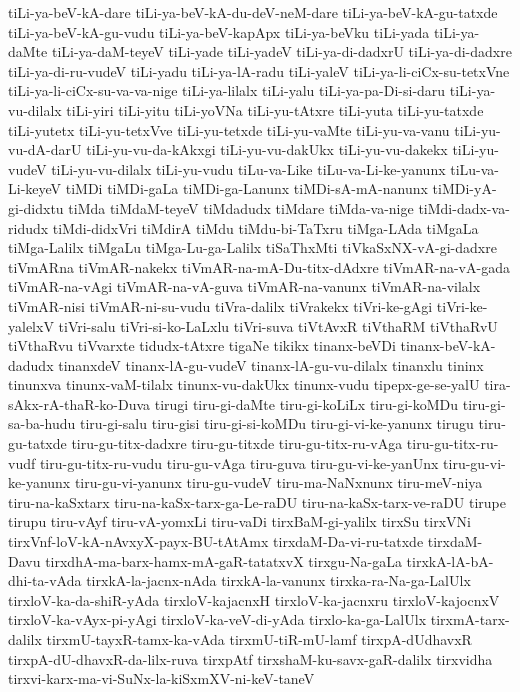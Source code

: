 {tiLi-ya-beV-kA-dare
tiLi-ya-beV-kA-du-deV-neM-dare
tiLi-ya-beV-kA-gu-tatxde
tiLi-ya-beV-kA-gu-vudu
tiLi-ya-beV-kapApx
tiLi-ya-beVku
tiLi-yada
tiLi-ya-daMte
tiLi-ya-daM-teyeV
tiLi-yade
tiLi-yadeV
tiLi-ya-di-dadxrU
tiLi-ya-di-dadxre
tiLi-ya-di-ru-vudeV
tiLi-yadu
tiLi-ya-lA-radu
tiLi-yaleV
tiLi-ya-li-ciCx-su-tetxVne
tiLi-ya-li-ciCx-su-va-va-nige
tiLi-ya-lilalx
tiLi-yalu
tiLi-ya-pa-Di-si-daru
tiLi-ya-vu-dilalx
tiLi-yiri
tiLi-yitu
tiLi-yoVNa
tiLi-yu-tAtxre
tiLi-yuta
tiLi-yu-tatxde
tiLi-yutetx
tiLi-yu-tetxVve
tiLi-yu-tetxde
tiLi-yu-vaMte
tiLi-yu-va-vanu
tiLi-yu-vu-dA-darU
tiLi-yu-vu-da-kAkxgi
tiLi-yu-vu-dakUkx
tiLi-yu-vu-dakekx
tiLi-yu-vudeV
tiLi-yu-vu-dilalx
tiLi-yu-vudu
tiLu-va-Like
tiLu-va-Li-ke-yanunx
tiLu-va-Li-keyeV
tiMDi
tiMDi-gaLa
tiMDi-ga-Lanunx
tiMDi-sA-mA-nanunx
tiMDi-yA-gi-didxtu
tiMda
tiMdaM-teyeV
tiMdadudx
tiMdare
tiMda-va-nige
tiMdi-dadx-va-ridudx
tiMdi-didxVri
tiMdirA
tiMdu
tiMdu-bi-TaTxru
tiMga-LAda
tiMgaLa
tiMga-Lalilx
tiMgaLu
tiMga-Lu-ga-Lalilx
tiSaThxMti
tiVkaSxNX-vA-gi-dadxre
tiVmARna
tiVmAR-nakekx
tiVmAR-na-mA-Du-titx-dAdxre
tiVmAR-na-vA-gada
tiVmAR-na-vAgi
tiVmAR-na-vA-guva
tiVmAR-na-vanunx
tiVmAR-na-vilalx
tiVmAR-nisi
tiVmAR-ni-su-vudu
tiVra-dalilx
tiVrakekx
tiVri-ke-gAgi
tiVri-ke-yalelxV
tiVri-salu
tiVri-si-ko-LaLxlu
tiVri-suva
tiVtAvxR
tiVthaRM
tiVthaRvU
tiVthaRvu
tiVvarxte
tidudx-tAtxre
tigaNe
tikikx
tinanx-beVDi
tinanx-beV-kA-dadudx
tinanxdeV
tinanx-lA-gu-vudeV
tinanx-lA-gu-vu-dilalx
tinanxlu
tininx
tinunxva
tinunx-vaM-tilalx
tinunx-vu-dakUkx
tinunx-vudu
tipepx-ge-se-yalU
tira-sAkx-rA-thaR-ko-Duva
tirugi
tiru-gi-daMte
tiru-gi-koLiLx
tiru-gi-koMDu
tiru-gi-sa-ba-hudu
tiru-gi-salu
tiru-gisi
tiru-gi-si-koMDu
tiru-gi-vi-ke-yanunx
tirugu
tiru-gu-tatxde
tiru-gu-titx-dadxre
tiru-gu-titxde
tiru-gu-titx-ru-vAga
tiru-gu-titx-ru-vudf
tiru-gu-titx-ru-vudu
tiru-gu-vAga
tiru-guva
tiru-gu-vi-ke-yanUnx
tiru-gu-vi-ke-yanunx
tiru-gu-vi-yanunx
tiru-gu-vudeV
tiru-ma-NaNxnunx
tiru-meV-niya
tiru-na-kaSxtarx
tiru-na-kaSx-tarx-ga-Le-raDU
tiru-na-kaSx-tarx-ve-raDU
tirupe
tirupu
tiru-vAyf
tiru-vA-yomxLi
tiru-vaDi
tirxBaM-gi-yalilx
tirxSu
tirxVNi
tirxVnf-loV-kA-nAvxyX-payx-BU-tAtAmx
tirxdaM-Da-vi-ru-tatxde
tirxdaM-Davu
tirxdhA-ma-barx-hamx-mA-gaR-tatatxvX
tirxgu-Na-gaLa
tirxkA-lA-bA-dhi-ta-vAda
tirxkA-la-jacnx-nAda
tirxkA-la-vanunx
tirxka-ra-Na-ga-LalUlx
tirxloV-ka-da-shiR-yAda
tirxloV-kajacnxH
tirxloV-ka-jacnxru
tirxloV-kajocnxV
tirxloV-ka-vAyx-pi-yAgi
tirxloV-ka-veV-di-yAda
tirxlo-ka-ga-LalUlx
tirxmA-tarx-dalilx
tirxmU-tayxR-tamx-ka-vAda
tirxmU-tiR-mU-lamf
tirxpA-dUdhavxR
tirxpA-dU-dhavxR-da-lilx-ruva
tirxpAtf
tirxshaM-ku-savx-gaR-dalilx
tirxvidha
tirxvi-karx-ma-vi-SuNx-la-kiSxmXV-ni-keV-taneV
}
